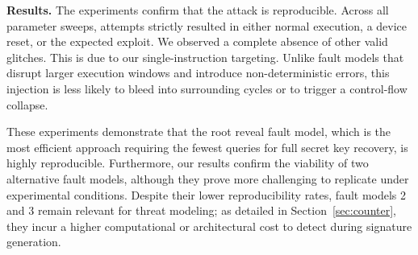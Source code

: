 \noindent\textbf{Results.} The experiments confirm that the attack is reproducible. 
Across all parameter sweeps, attempts strictly resulted in either normal execution, a device reset, or the expected exploit. 
We observed a complete absence of other valid glitches. This is due to our single-instruction targeting. Unlike  
fault models that disrupt larger execution windows and introduce non-deterministic errors, this injection is less likely
to bleed into surrounding cycles or to trigger a control-flow collapse.

These experiments demonstrate that the root reveal fault model, which is the most efficient approach requiring 
the fewest queries for full secret key recovery, is highly reproducible. Furthermore, our results confirm the viability of two alternative fault models,
although they prove more challenging to replicate under experimental conditions. Despite their lower reproducibility rates, 
fault models 2 and 3 remain relevant for threat modeling; as detailed in Section~\ref{sec:counter}, they incur a higher computational or architectural 
cost to detect during signature generation.